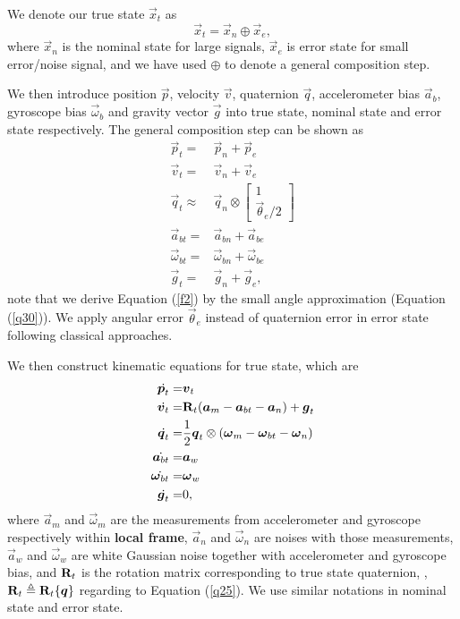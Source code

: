 We denote our true state $\vec{x}_t$ as
\begin{equation}\label{f1}
	\vec{x}_t = \vec{x}_n \oplus \vec{x}_e,
\end{equation}
where $\vec{x}_n$ is the nominal state for large signals, $\vec{x}_e$ is error state for small error/noise signal, and we have used $\oplus$ to denote a general composition step. 

We then introduce position $\vec{p}$, velocity $\vec{v}$, quaternion $\vec{q}$, accelerometer bias $\vec{a}_b$, gyroscope bias $\vec{\omega}_b$ and gravity vector $\vec{g}$ into true state, nominal state and error state respectively. The general composition step can be shown as
\begin{align}
	\vec{p}_t =& \vec{p}_n + \vec{p}_e \\
	\vec{v}_t =& \vec{v}_n + \vec{v}_e \\
	\vec{q}_t \approx& \vec{q}_n \otimes \begin{bmatrix} 1 \\ \vec{\theta}_e / 2 \end{bmatrix} \label{f2}\\
	\vec{a}_{bt} =& \vec{a}_{bn} + \vec{a}_{be} \\
	\vec{\omega}_{bt} =& \vec{\omega}_{bn} + \vec{\omega}_{be} \\ 
	\vec{g}_t =& \vec{g}_n + \vec{g}_e,
\end{align}
note that we derive Equation (\ref{f2}) by the small angle approximation (Equation (\ref{q30})). We apply angular error $\vec{\theta}_e$ instead of quaternion error in error state following classical approaches.

We then construct kinematic equations for true state, which are
\begin{align}
	\label{f18}
	\dot{\boldsymbol{p}_t} =& \boldsymbol{v}_t \\
	\dot{\boldsymbol{v}_t} =& \mathbf{R}_t(\boldsymbol{a}_m - \boldsymbol{a}_{bt} - \boldsymbol{a}_n) + \boldsymbol{g}_t\\
	\dot{\boldsymbol{q}_t} =& \frac{1}{2}\boldsymbol{q}_t \otimes (\boldsymbol{\omega}_m - \boldsymbol{\omega}_{bt} - \boldsymbol{\omega}_n) \\
	\dot{\boldsymbol{a}_{bt}} =& \boldsymbol{a}_w \\
	\dot{\boldsymbol{\omega}_{bt}} =& \boldsymbol{\omega}_{w} \\ 
	\label{f19}
	\dot{\boldsymbol{g}_t} =& 0,
\end{align}
where $\vec{a}_m$ and $\vec{\omega}_m$ are the measurements from accelerometer and gyroscope respectively within \textbf{local frame}, $\vec{a}_n$ and $\vec{\omega}_n$ are noises with those measurements, $\vec{a}_w$ and $\vec{\omega}_w$ are white Gaussian noise together with accelerometer and gyroscope bias, and $\mathbf{R}_t$ is the rotation matrix corresponding to true state quaternion, \ie, $\mathbf{R}_t \triangleq \mathbf{R}_t\{ \boldsymbol{q} \}$ regarding to Equation (\ref{q25}). We use similar notations in nominal state and error state. 

